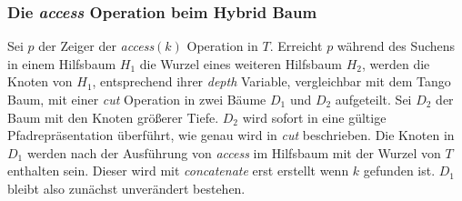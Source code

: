 \documentclass[a4paper,12pt]{article}
\begin{document}
 \subsubsection{Die \textit{access} Operation beim Hybrid Baum}
Sei $p$ der Zeiger der \textit{access}$\left(k\right)$ Operation in $T$. Erreicht $p$ während des Suchens in einem Hilfsbaum $H_1$ die Wurzel eines weiteren Hilfsbaum $H_2$, werden die Knoten von $H_1$, entsprechend ihrer \textit{depth} Variable, vergleichbar mit dem Tango Baum,  mit einer \textit{cut} Operation in zwei Bäume $D_1$ und $D_2$ aufgeteilt. Sei $D_2$ der Baum mit den Knoten größerer Tiefe. $D_2$ wird sofort in eine gültige Pfadrepräsentation überführt, wie genau wird in \textit{cut} beschrieben. Die Knoten in $D_1$ werden nach der Ausführung von \textit{access} im Hilfsbaum mit der Wurzel von $T$ enthalten sein. Dieser wird mit \textit{concatenate} erst erstellt wenn $k$ gefunden ist. $D_1$ bleibt also zunächst unverändert bestehen.       
\end{document}
